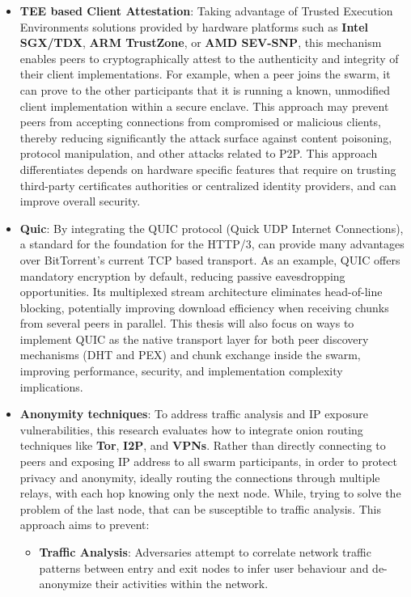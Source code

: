 \begin{itemize}
  \item \textbf{TEE based Client Attestation}: Taking advantage of Trusted Execution Environments solutions provided by hardware platforms such as \textbf{Intel SGX/TDX}, \textbf{ARM TrustZone}, or \textbf{AMD SEV-SNP}, this mechanism enables peers to cryptographically attest to the authenticity and integrity of their client implementations. For example, when a peer joins the swarm, it can prove to the other participants that it is running a known, unmodified client implementation within a secure enclave. This approach may prevent peers from accepting connections from compromised or malicious clients, thereby reducing significantly the attack surface against content poisoning, protocol manipulation, and other attacks related to P2P. This approach differentiates depends on hardware specific features that require on trusting third-party certificates authorities or centralized identity providers, and can improve overall security.

  \item \textbf{Quic}: By integrating the QUIC protocol (Quick UDP Internet Connections), a standard for the foundation for the HTTP/3, can provide many advantages over BitTorrent's current TCP based transport. As an example, QUIC offers mandatory encryption by default, reducing passive eavesdropping opportunities. Its multiplexed stream architecture eliminates head-of-line blocking, potentially improving download efficiency when receiving chunks from several peers in parallel. This thesis will also focus on ways to implement QUIC as the native transport layer for both peer discovery mechanisms (DHT and PEX) and chunk exchange inside the swarm, improving performance, security, and implementation complexity implications.

  \item \textbf{Anonymity techniques}: To address traffic analysis and IP exposure vulnerabilities, this research evaluates how to integrate onion routing techniques like \textbf{Tor}, \textbf{I2P}, and \textbf{VPNs}. Rather than directly connecting to peers and exposing IP address to all swarm participants, in order to protect privacy and anonymity, ideally routing the connections through multiple relays, with each hop knowing only the next node. While, trying to solve the problem of the last node, that can be susceptible to traffic analysis. This approach aims to prevent:

  \begin{itemize}
    \item \textbf{Traffic Analysis}: Adversaries attempt to correlate network traffic patterns between entry and exit nodes to infer user behaviour and de-anonymize their activities within the network.


\end{itemize}
\end{itemize}
